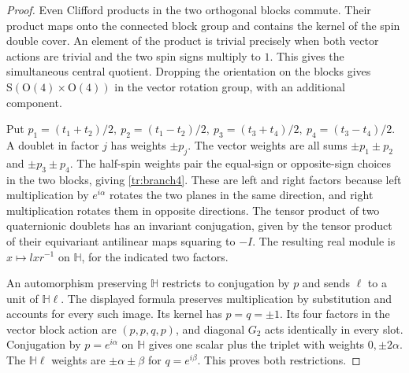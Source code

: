 \documentclass[aps,pra,onecolumn,superscriptaddress,nofootinbib,10pt]{revtex4-2}
\theoremstyle{definition}
\theoremstyle{remark}
\begin{document}
\begin{proof}
Even Clifford products in the two orthogonal blocks commute.
Their product maps onto the connected block group and contains
the kernel of the spin double cover. An element of the product
is trivial precisely when both vector actions are trivial and
the two spin signs multiply to \(1\). This gives the simultaneous
central quotient. Dropping the orientation on the blocks gives
\(\mathrm S(\mathrm O(4)\times\mathrm O(4))\) in the vector rotation
group, with an additional component.

Put \(p_1=(t_1+t_2)/2,\ p_2=(t_1-t_2)/2,\ 
p_3=(t_3+t_4)/2,\ p_4=(t_3-t_4)/2\).
A doublet in factor \(j\) has weights \(\pm p_j\).
The vector weights are all sums \(\pm p_1\pm p_2\) and
\(\pm p_3\pm p_4\). The half-spin weights pair the equal-sign
or opposite-sign choices in the two blocks, giving
\eqref{tr:branch4}. These are left and right factors because
left multiplication by \(e^{i\alpha}\) rotates the two planes
in the same direction, and right multiplication rotates them in
opposite directions. The tensor product of two quaternionic
doublets has an invariant conjugation, given by the tensor product
of their equivariant antilinear maps squaring to \(-I\).
The resulting real module is \(x\mapsto lxr^{-1}\)
on \(\mathbb H\), for the indicated two factors.

An automorphism preserving \(\mathbb H\) restricts to conjugation
by \(p\) and sends \(\ell\) to a unit of \(\mathbb H\ell\).
The displayed formula preserves multiplication by substitution
and accounts for every such image. Its kernel has \(p=q=\pm1\).
Its four factors in the vector block action are \((p,p,q,p)\),
and diagonal \(G_2\) acts identically in every slot.
Conjugation by \(p=e^{i\alpha}\) on \(\mathbb H\) gives one
scalar plus the triplet with weights \(0,\pm2\alpha\).
The \(\mathbb H\ell\) weights are \(\pm\alpha\pm\beta\)
for \(q=e^{i\beta}\). This proves both restrictions.
\end{proof}
\end{document}
